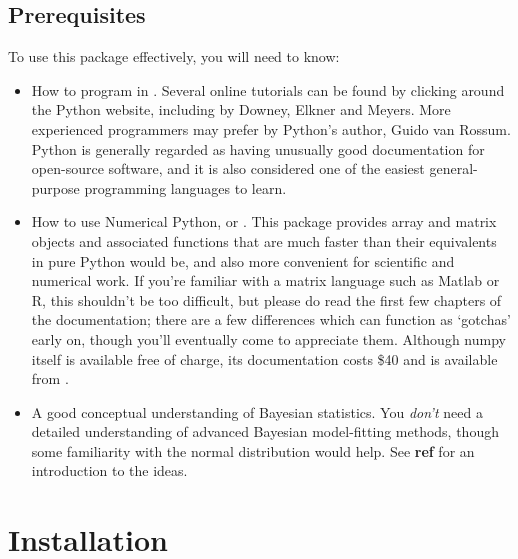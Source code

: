 \documentclass{manual}
\begin{document}
\section{Prerequisites}\label{sec:prerequisites}
To use this package effectively, you will need to know:
\begin{itemize}
	\item How to program in . Several online tutorials can be found by clicking around the Python website, including  by Downey, Elkner and Meyers. More experienced programmers may prefer  by Python's author, Guido van Rossum. Python is generally regarded as having unusually good documentation for open-source software, and it is also considered one of the easiest general-purpose programming languages to learn.
	\item How to use Numerical Python, or . This package provides array and matrix objects and associated functions that are much faster than their equivalents in pure Python would be, and also more convenient for scientific and numerical work. If you're familiar with a matrix language such as Matlab or R, this shouldn't be too difficult, but please do read the first few chapters of the documentation; there are a few differences which can function as `gotchas' early on, though you'll eventually come to appreciate them. Although numpy itself is available free of charge, its documentation costs \$40 and is available from . 
	\item A good conceptual understanding of Bayesian statistics. You \emph{don't} need a detailed understanding of advanced Bayesian model-fitting methods, though some familiarity with the normal distribution would help. See \textbf{ref} for an introduction to the ideas.
\end{itemize}



\chapter{Installation}\label{cha:installation} %
\end{document}
